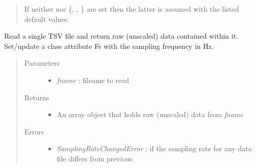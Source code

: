 \documentclass[letterpaper,10pt,english]{sphinxmanual}
\begin{document}
\begin{fulllineitems}
\begin{quote}
\begin{description}
\begin{description}
\begin{description}
\begin{itemize}
\end{itemize}

\end{description}

\end{description}

If neither  nor \{, , \} are set then the latter 
is assumed with the listed default values.

\end{description}\end{quote}

\begin{fulllineitems}
\label{api-doc/mosaic.traj:mosaic.tsvTrajIO.tsvTrajIO.readdata}
Read a single TSV file and return raw (unscaled) data contained within it.
Set/update a class attribute Fs with the sampling frequency in Hz.
\begin{quote}\begin{description}
\item[{Parameters}] \leavevmode\begin{itemize}
\item {} 
\emph{fname} :  fileame to read

\end{itemize}

\item[{Returns}] \leavevmode\begin{itemize}
\item {} 
An array object that holds raw (unscaled) data from \emph{fname}

\end{itemize}

\item[{Errors}] \leavevmode\begin{itemize}
\item {} 
\emph{SamplingRateChangedError} : if the sampling rate for any data file differs from previous

\end{itemize}

\end{description}\end{quote}

\end{fulllineitems}


\end{fulllineitems}
\end{document}
